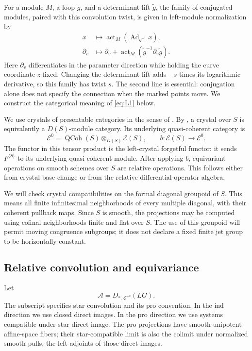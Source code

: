 \documentclass[11pt]{article}
\numberwithin{equation}{section}
\theoremstyle{definition}
\theoremstyle{remark}
\begin{document}
For a module $M$, a loop $g$, and a determinant lift $\widetilde g$, the
family of conjugated modules, paired with this convolution twist, is
given in left-module normalization by
\begin{equation}\label{eq:L1}
 \begin{split}
 x&\longmapsto\operatorname{act}_M(\operatorname{Ad}_{g^{-1}}x),\\
 \partial_v&\longmapsto\partial_v+
       \operatorname{act}_M(\widetilde g^{-1}\partial_v\widetilde g).
 \end{split}
\end{equation}
Here $\partial_v$ differentiates in the parameter direction while holding
the curve coordinate $z$ fixed.  Changing the determinant lift adds
$-s$ times its logarithmic derivative, so this family has twist $s$.
The second line is essential: conjugation alone does not specify the
connection when the marked points move.  We construct the categorical
meaning of \eqref{eq:L1} below.

We use crystals of presentable categories in the sense of
\cite[Section~2 and Appendix~B, especially Sections~B.3.8--B.3.11
and~B.14]{GLCII}.  By
\cite[Theorem~2.6.3]{Gaitsgory1Affine}, a crystal over $S$ is equivalently
a $D(S)$-module category.  Its underlying quasi-coherent category is
\[
 \mathcal E^0=\operatorname{QCoh}(S)
                   \otimes_{D(S)}\mathcal E(S),
 \qquad b:\mathcal E(S)\longrightarrow\mathcal E^0.
\]
The functor in this tensor product is the left-crystal forgetful functor:
it sends $F^{\langle S\rangle}$ to its underlying quasi-coherent module.
After applying $b$, equivariant operations on smooth schemes over $S$
are relative operations.  This follows either from crystal base change
or from the relative differential-operator algebra.

We will check crystal compatibilities on the formal diagonal groupoid
of $S$.  This means all finite infinitesimal neighborhoods of every
multiple diagonal, with their coherent pullback maps.  Since $S$ is
smooth, the projections may be computed using cofinal neighborhoods
finite and flat over $S$.  The use of this groupoid will permit moving
congruence subgroups; it does not declare a fixed finite jet group to
be horizontally constant.

\subsection{Relative convolution and equivariance}

Let
\[
                     \mathcal A=D_{*,\mathcal L^{-s}}(LG).
\]
The subscript specifies star convolution and its pro convention.
In the ind direction we use closed direct images.  In the pro direction
we use systems compatible under star direct image.  The pro projections
have smooth unipotent affine-space fibers; their star-compatible limit
is also the colimit under normalized smooth pulls, the left adjoints of
those direct images.
\end{document}
